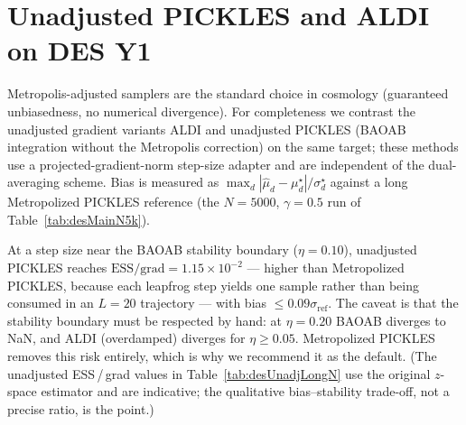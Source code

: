 \documentclass{article}
\begin{document}
\appendix

\section{Unadjusted PICKLES and ALDI on DES Y1}\label{app:desUnadjusted}

Metropolis-adjusted samplers are the standard choice in cosmology
(guaranteed unbiasedness, no numerical divergence). For completeness we
contrast the unadjusted gradient variants ALDI and unadjusted PICKLES
(BAOAB integration without the Metropolis correction) on the same
target; these methods use a projected-gradient-norm step-size adapter
and are independent of the dual-averaging scheme. Bias is measured as
$\max_d|\hat\mu_d-\mu_d^\star|/\sigma_d^\star$ against a long
Metropolized PICKLES reference (the $N=5000$, $\gamma=0.5$ run of
Table~\ref{tab:desMainN5k}).

At a step size near the BAOAB stability boundary ($\eta=0.10$),
unadjusted PICKLES reaches $\text{ESS}/\text{grad}=1.15\times10^{-2}$ ---
higher than Metropolized PICKLES, because each leapfrog step yields one
sample rather than being consumed in an $L=20$ trajectory --- with bias
$\le0.09\sigma_{\text{ref}}$. The caveat is that the stability boundary
must be respected by hand: at $\eta=0.20$ BAOAB diverges to NaN, and
ALDI (overdamped) diverges for $\eta\ge0.05$. Metropolized PICKLES
removes this risk entirely, which is why we recommend it as the default.
(The unadjusted ESS\,/\,grad values in Table~\ref{tab:desUnadjLongN} use
the original $z$-space estimator and are indicative; the qualitative
bias--stability trade-off, not a precise ratio, is the point.)
\end{document}
